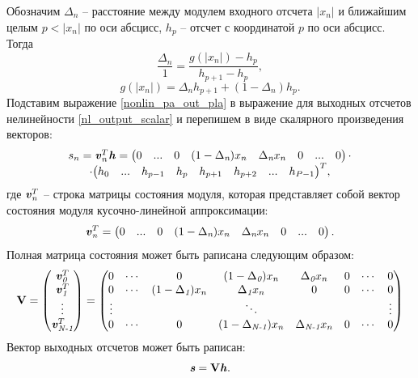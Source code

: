 Обозначим $\Delta_{\textit{n}}$ -- расстояние между модулем входного отсчета $|x_n|$ и ближайшим целым $p<|x_n|$ по оси абсцисс, $h_p$ -- отсчет с координатой $p$ по оси абсцисс. Тогда
\begin{equation}
	\frac{\Delta_{\textit{n}}}{1}=\frac{g(|x_n|)-h_p}{h_{p+1}-h_p},
\end{equation}
\begin{equation}
	g(|x_n|)=\Delta_{\textit{n}}h_{p+1}+(1-\Delta_{\textit{n}})h_p.
	\label{nonlin_pa_out_pla}
\end{equation}
Подставим выражение \eqref{nonlin_pa_out_pla} в выражение для выходных отсчетов нелинейности \eqref{nl_output_scalar} и перепишем в виде скалярного произведения векторов:
\begin{equation}
	\begin{matrix}
		s_n={\textbf{\textit{v}}_\textit{n}^{T}}{\textbf{\textit{h}}}=\begin{pmatrix} 0 & ... & 0 & (1-\Delta_{\textit{n}})x_n & \Delta_{\textit{n}}x_n & 0 & ... & 0 \end{pmatrix}\cdot\\\cdot{\begin{pmatrix} h_0 & ... & h_{p-1} & h_{p} & h_{p+1} & h_{p+2} & ... & h_{P-1} \end{pmatrix}}^T,
		\label{pla_out_vec}
	\end{matrix}
\end{equation}
где $\textbf{\textit{v}}_\textit{n}^{T}$ -- строка матрицы состояния модуля, которая представляет собой вектор состояния модуля кусочно-линейной аппроксимации:
\begin{equation}
	{\textbf{\textit{v}}_\textit{n}^{T}}=\begin{pmatrix} 0 & ... & 0 & (1-\Delta_{\textit{n}})x_n & \Delta_{\textit{n}}x_n & 0 & ... & 0\end{pmatrix}.
	\label{pla_state_vec}
\end{equation}
Полная матрица состояния может быть раписана следующим образом:
\begin{equation}
	\textbf{V}=\begin{pmatrix}\textbf{\textit{v}}_\textit{0}^{T} \\ \textbf{\textit{v}}_\textit{1}^{T} \\ \vdots \\ \textbf{\textit{v}}_\textit{N-1}^{T}\end{pmatrix}=\begin{pmatrix} 0 & \cdots & 0 & (1-\Delta_{\textit{0}})x_n & \Delta_{\textit{0}}x_n & 0 & \cdots & 0 \\ 0 & \cdots & (1-\Delta_{\textit{1}})x_n & \Delta_{\textit{1}}x_n & 0 & 0 & \cdots & 0 \\ \vdots & & & \ddots & & & & \vdots \\ 0 & \cdots & 0 & (1-\Delta_{\textit{N-1}})x_n & \Delta_{\textit{N-1}}x_n & 0 & \cdots & 0 \end{pmatrix}
	\label{state_matr_pla}
\end{equation}
Вектор выходных отсчетов  может быть раписан:
\begin{equation}
	\textbf{\textit{s}}=\textbf{V}\textbf{\textit{h}}.
	\label{vec_matr_out}
\end{equation}

